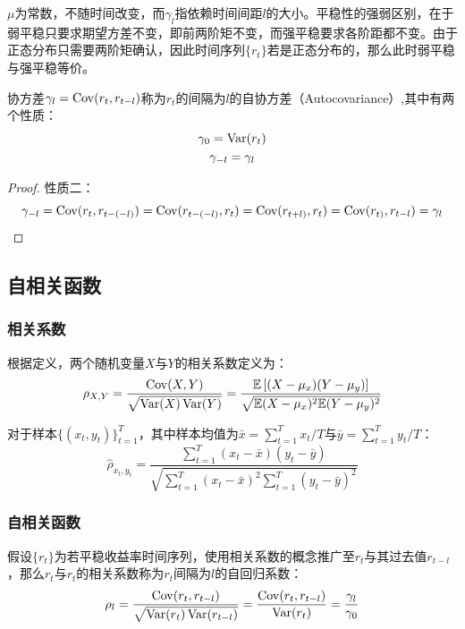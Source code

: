\documentclass[11pt]{article}
\begin{document}
$\mu$为常数，不随时间改变，而$\gamma_l$指依赖时间间距$l$的大小。平稳性的强弱区别，在于弱平稳只要求期望方差不变，即前两阶矩不变，而强平稳要求各阶距都不变。由于正态分布只需要两阶矩确认，因此时间序列$\{r_t\}$若是正态分布的，那么此时弱平稳与强平稳等价。

协方差$\gamma_l = \operatorname{Cov}(r_t,r_{t-l})$称为$r_t$的间隔为$l$的自协方差（Autocovariance）,其中有两个性质：
\begin{gather*}
    \gamma_0 = \operatorname{Var}(r_t) \\
    \gamma_{-l} = \gamma_{l}
\end{gather*}

\begin{proof}
    性质二：
    \begin{equation*}
        \gamma_{-l} = \operatorname{Cov}(r_{t},r_{t-(-l)}) = \operatorname{Cov}(r_{t-(-l)},r_{t}) 
        = \operatorname{Cov}(r_{t+l)},r_{t}) = \operatorname{Cov}(r_{t)},r_{t-l}) = \gamma_{l}
    \end{equation*}
\end{proof}

\subsection{自相关函数}

\subsubsection{相关系数}

根据定义，两个随机变量$X$与$Y$的相关系数定义为：
\begin{equation*}
    \rho_{X,Y} = \frac{\operatorname{Cov}(X,Y)}{\sqrt{\operatorname{Var}(X)\operatorname{Var}(Y)}}
    = \frac{\mathbb{E}\left[(X-\mu_x)(Y-\mu_y)\right]}{\sqrt{\mathbb{E}(X-\mu_x)^2 \mathbb{E}(Y-\mu_y)^2}}
\end{equation*}

对于样本$\{(x_t,y_t)\}_{t=1}^{T}$，其中样本均值为$\bar{x}=\sum_{t=1}^{T}x_t/T$与$\bar{y}=\sum_{t=1}^{T}y_t/T$：
\begin{equation*}
    \hat{\rho}_{x_t,y_t} = \frac{\sum_{t=1}^{T}(x_t-\bar{x})(y_t-\bar{y})}{\sqrt{\sum_{t=1}^{T}(x_t-\bar{x})^2 \sum_{t=1}^{T}(y_t-\bar{y})^2}}
\end{equation*}

\subsubsection{自相关函数}

假设$\{r_t\}$为若平稳收益率时间序列，使用相关系数的概念推广至$r_t$与其过去值$r_{t-l}$，那么$r_t$与$r_{t}$的相关系数称为$r_t$间隔为$l$的自回归系数：
\begin{equation*}
    \rho_l = \frac{\operatorname{Cov}(r_t,r_{t-l})}{\sqrt{\operatorname{Var}(r_t)\operatorname{Var}(r_{t-l})}} 
    = \frac{\operatorname{Cov}(r_t,r_{t-l})}{\operatorname{Var}(r_t)}
    = \frac{\gamma_l}{\gamma_0}
\end{equation*}
\end{document}
